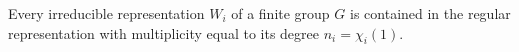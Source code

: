 Every irreducible representation $W_i$ of a finite group $G$ is contained in the regular representation with multiplicity equal to its degree $n_i = \chi_i(1)$.